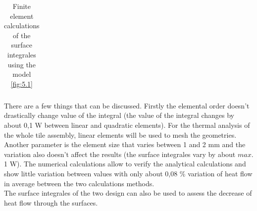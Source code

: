 \begin{table}[h!]
\begin{tabular}{p{}p{}p{}p{}p{}p{} }
    \bottomrule
\end{tabular}
\caption{Finite element calculations of the surface integrales using the model \ref{fig:5.1}}
\end{table}

\normalsize{\indent There are a few things that can be discussed. Firstly the elemental order doesn't drastically change value of the integral (the value of the integral changes by about 0,1 \unit{W} between linear and quadratic elements). For the thermal analysis of the whole tile assembly, linear elements will be used to mesh the geometries. Another parameter is the element size that varies between 1 and 2 \unit{mm} and the variation also doesn't affect the results (the surface integrales vary by about $max.$ 1 \unit{W}). The numerical calculations allow to verify the analytical calculations and show little variation between values with only about 0,08 \% variation of heat flow in average between the two calculations methods.}
\\
\break
\normalsize{\indent The surface integrales of the two design can also be used to assess the decrease of heat flow through the surfaces.}

